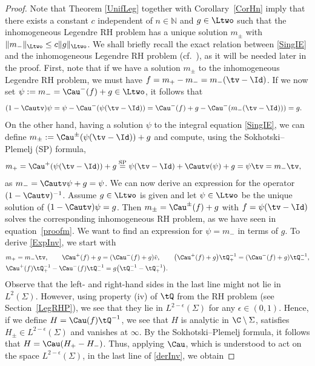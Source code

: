 \begin{proof}
Note that Theorem \ref{UnifLeg} together with Corollary~\ref{CorHn} imply that there exists a constant $c$ independent of $n\in \mathbb{N}$ and $g\in \Ltwo$ such that the inhomogeneous Legendre RH problem has a unique solution $m_\pm$ with $\Vert m_- \Vert_{\Ltwo} \leq c\Vert g \Vert_{\Ltwo}$. We shall briefly recall the exact relation between \eqref{SingIE} and the inhomogeneous Legendre RH problem (cf.\ \cite[Section~2]{DZSob}), as it will be needed later in the proof. First, note that if we have a solution $m_\pm$ to the inhomogeneous Legendre RH problem, we must have $f = m_+ - m_- = m_-(\tv-\Id)$. If we now set $\psi := m_- = \Cau^-(f)+g \in \Ltwo$, it follows that
\begin{align*}
 (1-\Cautv)\psi &= \psi - \Cau^-(\psi (\tv-\Id))= \Cau^-(f) + g - \Cau^-(m_-(\tv-\Id)))= g.
\end{align*}
On the other hand, having a solution $\psi$ to the integral equation \eqref{SingIE}, we can define $m_\pm := \Cau^\pm(\psi (\tv-\Id)) + g$ and compute, using the Sokhotski--Plemelj (SP) formula,
\begin{align}\label{proofm}
 m_+ &= \Cau^+(\psi (\tv-\Id)) + g\overset{\text{SP}}{=} \psi (\tv-\Id) + \Cautv(\psi) + g= \psi \tv= m_- \tv,
\end{align}
as $m_- = \Cautv \psi + g = \psi$.
We can now derive an expression for the operator $(1 - \Cautv)^{-1}$. Assume $g \in \Ltwo$ is given and let $\psi \in \Ltwo$ be the unique solution of $(1-\Cautv)\psi = g$. Then $m_\pm = \Cau^\pm(f)+g$ with $f = \psi (\tv-\Id)$ solves the corresponding inhomogeneous RH problem, as we have seen in equation~\eqref{proofm}. We want to find an expression for $\psi = m_-$ in terms of $g$. To derive \eqref{ExpInv}, we start with
\begin{align}
& m_+ = m_- \tv, \qquad
 \Cau^+(f) + g = (\Cau^-(f) + g)\tilde v,\qquad \big(\Cau^+(f) + g\big)\tQ_+^{-1} = (\Cau^-(f) + g)\tQ_-^{-1},\nonumber
 \\
& \Cau^+(f)\tQ_+^{-1} - \Cau^-(f)\tQ_-^{-1} = g\big(\tQ_-^{-1}-\tQ_+^{-1}\big).\label{derInv}
 \end{align}
Observe that the left- and right-hand sides in the last line might not lie in $L^2(\Sigma)$. However, using property (iv) of $\tQ$ from the RH problem (see Section~\ref{LegRHP}), we see that they lie in $L^{2-\epsilon}(\Sigma)$ for any $\epsilon \in (0,1)$. Hence, if we define $H = \Cau(f) \tQ^{-1}$, we see that $H$ is analytic in $\C \setminus \Sigma$, satisfies $H_\pm \in L^{2-\epsilon}(\Sigma)$ and vanishes at $\infty$. By the Sokhotski--Plemelj formula, it follows that $H = \Cau(H_+-H_-)$. Thus, applying $\Cau$, which is understood to act on the space $L^{2-\epsilon}(\Sigma)$, in the last line of \eqref{derInv}, we obtain

\end{proof}
